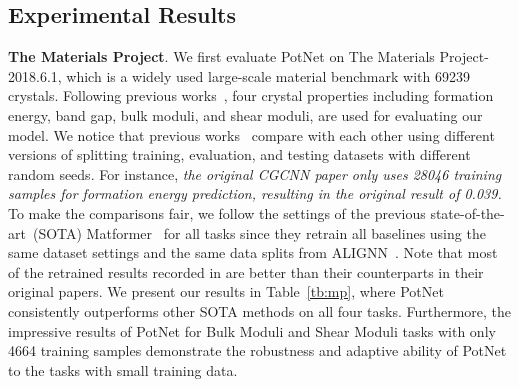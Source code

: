 \documentclass[nohyperref]{article}
\theoremstyle{plain}
\theoremstyle{definition}
\theoremstyle{remark}
\begin{document}
\begin{table}[t]
\vskip -0.1in
\caption{Training time per epoch, total training time, total testing time, and model complexity compared with ALIGNN and Matformer on JARVIS formation energy prediction.}
\begin{center}
\vskip -0.1in
\label{tb:efficiency}
\end{center}
\vskip -0.3in
\end{table}

\subsection{Experimental Results}
\label{exp_results}

\textbf{The Materials Project}. We first evaluate PotNet on The Materials Project-2018.6.1, which is a widely used large-scale material benchmark with 69239 crystals. Following previous works~\citep{xie2018crystal,MegNet,ALIGNN,GATGNN,yan2022periodic}, four crystal properties including formation energy, band gap, bulk moduli, and shear moduli, are used for evaluating our model. We notice that previous works~\citep{xie2018crystal,MegNet,ALIGNN,GATGNN,schutt2017schnet} compare with each other using different versions of splitting training, evaluation, and testing datasets with different random seeds. For instance, \emph{the original CGCNN paper only uses 28046 training samples for formation energy prediction, resulting in the original result of 0.039.} To make the comparisons fair, we follow the settings of the previous state-of-the-art~(SOTA) Matformer~\citep{yan2022periodic} for all tasks since they retrain all baselines using the same dataset settings and the same data splits from ALIGNN~\citep{ALIGNN}. Note that most of the retrained results recorded in \citet{yan2022periodic} are better than their counterparts in their original papers. We present our results in Table~\ref{tb:mp}, where PotNet consistently outperforms other SOTA methods on all four tasks. 
Furthermore, the impressive results of PotNet for Bulk Moduli and Shear Moduli tasks with only 4664 training samples demonstrate the robustness and adaptive ability of PotNet to the tasks with small training data.  
\end{document}
